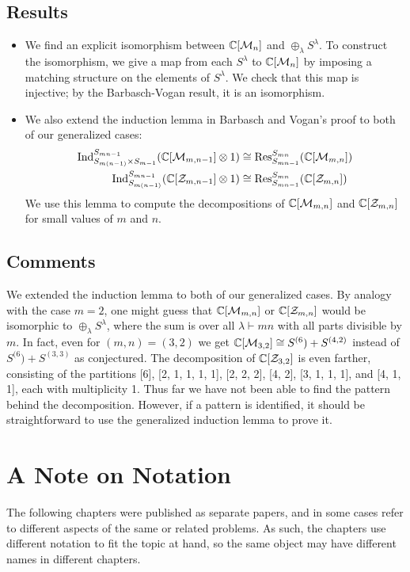 \subsection{Results}
\begin{itemize}
\item We find an explicit isomorphism between $\mathbb{C}[\mathcal{M}_{n}]$ and $\oplus_\lambda S^\lambda$.
To construct the isomorphism, we give a map from each $S^\lambda$ to $\mathbb{C}[\mathcal{M}_{n}]$ by imposing a matching structure on the elements of $S^\lambda$.
We check that this map is injective; by the Barbasch-Vogan result, it is an isomorphism.
\item We also extend the induction lemma in Barbasch and Vogan's proof to both of our generalized cases:
\begin{align*}
 \textup{Ind}_{S_{m(n-1)} \times S_{m-1}}^{S_{mn-1}}(\mathbb{C}[\mathcal{M}_{m,n-1}] \otimes 1) & \cong \textup{Res}_{S_{mn-1}}^{S_{mn}}( \mathbb{C}[\mathcal{M}_{m,n}]) \\
 \textup{Ind}_{S_{m(n-1)} }^{S_{mn-1}}(\mathbb{C}[\mathcal{Z}_{m,n-1}] \otimes 1) & \cong \textup{Res}_{S_{mn-1}}^{S_{mn}}( \mathbb{C}[\mathcal{Z}_{m,n}])
\end{align*}
We use this lemma to compute the decompositions of $\mathbb{C}[\mathcal{M}_{m,n}]$ and $\mathbb{C}[\mathcal{Z}_{m,n}]$ for small values of $m$ and $n$.
\end{itemize}

\subsection{Comments}
We extended the induction lemma to both of our generalized cases.
By analogy with the case $m=2$, one might guess that $\mathbb{C}[\mathcal{M}_{m,n}]$ or $\mathbb{C}[\mathcal{Z}_{m,n}]$ would be isomorphic to $\oplus_\lambda S^\lambda$, where the sum is over all $\lambda \vdash mn$ with all parts divisible by $m$.
In fact, even for $(m,n)=(3,2)$ we get $\mathbb{C}[\mathcal{M}_{3,2}] \cong S^{(6}) + S^{(4,2)}$ instead of $S^{(6}) + S^{(3,3)}$ as conjectured.
The decomposition of $\mathbb{C}[\mathcal{Z}_{3,2}]$ is even farther, consisting of the partitions [6], [2, 1, 1, 1, 1], [2, 2, 2], [4, 2], [3, 1, 1, 1], and [4, 1, 1], each with multiplicity 1.
Thus far we have not been able to find the pattern behind the decomposition.
However, if a pattern is identified, it should be straightforward to use the generalized induction lemma to prove it.


\section{A Note on Notation}
The following chapters were published as separate papers, and in some cases refer to different aspects of the same or related problems. 
As such, the chapters use different notation to fit the topic at hand, so the same object may have different names in different chapters.
